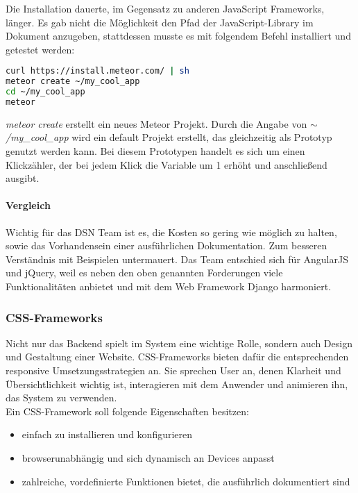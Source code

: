 Die Installation dauerte, im Gegensatz zu anderen JavaScript Frameworks, länger. Es gab nicht die Möglichkeit den Pfad der JavaScript-Library im Dokument anzugeben, stattdessen musste es mit folgendem Befehl installiert und getestet werden:
\begin{lstlisting}[caption={Installation von Meteor \cite{METEORINSTALL}}, language=bash]
curl https://install.meteor.com/ | sh
meteor create ~/my_cool_app
cd ~/my_cool_app
meteor
\end{lstlisting}

\textit{meteor create} erstellt ein neues Meteor Projekt. Durch die Angabe von \textit{$\sim$/my\_cool\_app} wird ein default Projekt erstellt, das gleichzeitig als Prototyp genutzt werden kann. Bei diesem Prototypen handelt es sich um einen Klickzähler, der bei jedem Klick die Variable um 1 erhöht und anschließend ausgibt.

\paragraph{Vergleich}
Wichtig für das DSN Team ist es, die Kosten so gering wie möglich zu halten, sowie das Vorhandensein einer ausführlichen Dokumentation. Zum besseren Verständnis mit Beispielen untermauert. Das Team entschied sich für AngularJS und jQuery, weil es neben den oben genannten Forderungen viele Funktionalitäten anbietet und mit dem Web Framework Django harmoniert.

\newpage

\subsubsection{CSS-Frameworks}
Nicht nur das Backend spielt im System eine wichtige Rolle, sondern auch Design und Gestaltung einer Website. CSS-Frameworks bieten dafür die entsprechenden responsive Umsetzungsstrategien an. Sie sprechen User an, denen Klarheit und Übersichtlichkeit wichtig ist, interagieren mit dem Anwender und animieren ihn, das System zu verwenden. \\
Ein CSS-Framework soll folgende Eigenschaften besitzen:
\begin{itemize}
\item einfach zu installieren und konfigurieren
\item browserunabhängig und sich dynamisch an Devices anpasst
\item zahlreiche, vordefinierte Funktionen bietet, die ausführlich dokumentiert sind
\end{itemize} \cite{CSS}

